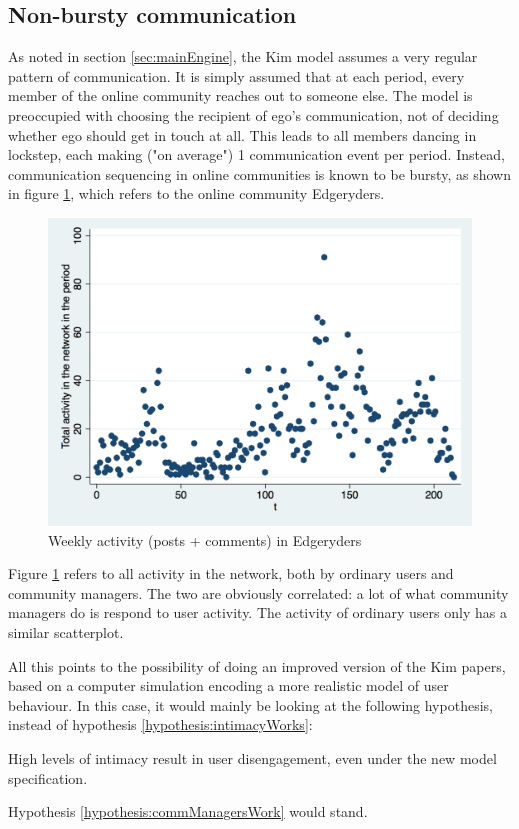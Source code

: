 \documentclass{article}
\begin{document}
\subsection{Non-bursty communication}

As noted in section \ref{sec:mainEngine}, the Kim model assumes a very regular pattern of communication. It is simply assumed that at each period, every member of the online community reaches out to someone else. The model is preoccupied with choosing the recipient of ego's communication, not of deciding whether ego should get in touch at all. This leads to all members dancing in lockstep, each making ("on average") 1 communication event per period. Instead, communication sequencing in online communities is known to be bursty, as shown in figure \ref{fig:burstyActivity}, which refers to the online community Edgeryders.

\begin{figure}
	\includegraphics[width = \textwidth]{Bursty_comms_ER} 
	\caption{Weekly activity (posts + comments) in Edgeryders}
	\label{fig:burstyActivity}
\end{figure}

Figure \ref{fig:burstyActivity} refers to all activity in the network, both by ordinary users and community managers. The two are obviously correlated: a lot of what community managers do is respond to user activity. The activity of ordinary users only has a similar scatterplot.

All this points to the possibility of doing an improved version of the Kim papers, based on a computer simulation encoding a more realistic model of user behaviour. In this case, it would mainly be looking at the following hypothesis, instead of hypothesis \ref{hypothesis:intimacyWorks}:

\begin{intimacy}
	High levels of intimacy result in user disengagement, even under the new model specification.
	\label{hypothesis:newModelWorks}
\end{intimacy}

Hypothesis \ref{hypothesis:commManagersWork} would stand.
\end{document}
